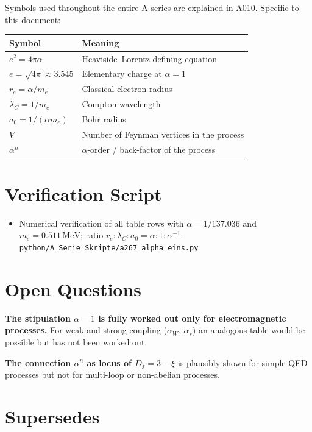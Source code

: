 Symbols used throughout the entire A-series are explained in A010.
Specific to this document:

\begin{center}
\renewcommand{\arraystretch}{1.3}
{\small\begin{tabular}{lp{9cm}}
\toprule
Symbol & Meaning \\
\midrule
$e^2 = 4\pi\alpha$ & Heaviside--Lorentz defining equation \\
$e = \sqrt{4\pi}\approx3{.}545$ & Elementary charge at $\alpha=1$ \\
$r_e = \alpha/m_e$ & Classical electron radius \\
$\lambda_C = 1/m_e$ & Compton wavelength \\
$a_0 = 1/(\alpha m_e)$ & Bohr radius \\
$V$ & Number of Feynman vertices in the process \\
$\alpha^n$ & $\alpha$-order / back-factor of the process \\
\bottomrule
\end{tabular}}
\renewcommand{\arraystretch}{1.0}
\end{center}

\section{Verification Script}

\begin{itemize}[leftmargin=2em,itemsep=2pt,topsep=2pt]
  \item Numerical verification of all table rows with $\alpha=1/137{.}036$
    and $m_e=0{.}511\,\text{MeV}$; ratio $r_e:\lambda_C:a_0=\alpha:1:\alpha^{-1}$:
    \texttt{python/A\_Serie\_Skripte/a267\_alpha\_eins.py}
\end{itemize}

\section{Open Questions}

\textbf{The stipulation $\alpha=1$ is fully worked out only for electromagnetic
processes.} For weak and strong coupling ($\alpha_W$, $\alpha_s$) an analogous
table would be possible but has not been worked out.

\textbf{The connection $\alpha^n$ as locus of $D_f=3-\xi$} is plausibly shown
for simple QED processes but not for multi-loop or non-abelian processes.

\section{Supersedes}

